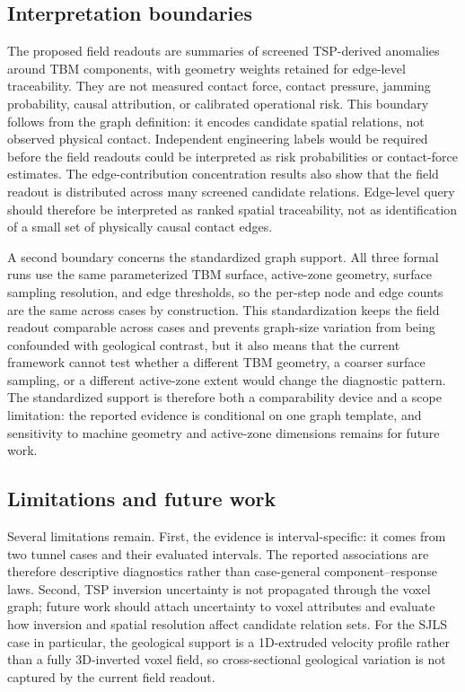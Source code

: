 \subsection{Interpretation boundaries}
\label{sec:interpretation_boundary}
The proposed field readouts are summaries of screened TSP-derived anomalies around
TBM components, with geometry weights retained for edge-level traceability.
They are not measured contact force, contact pressure, jamming probability,
causal attribution, or calibrated operational risk. This boundary follows from
the graph definition: it encodes candidate spatial relations, not observed
physical contact. Independent engineering labels would be required before the
field readouts could be interpreted as risk probabilities or contact-force
estimates.
The edge-contribution concentration results also show that the field readout is
distributed across many screened candidate relations. Edge-level query should
therefore be interpreted as ranked spatial traceability, not as identification
of a small set of physically causal contact edges.

A second boundary concerns the standardized graph support. All three formal
runs use the same parameterized TBM surface, active-zone geometry, surface
sampling resolution, and edge thresholds, so the per-step node and edge counts
are the same across cases by construction. This standardization keeps the
field readout comparable across cases and prevents graph-size variation from being
confounded with geological contrast, but it also means that the current
framework cannot test whether a different TBM geometry, a coarser surface
sampling, or a different active-zone extent would change the diagnostic
pattern. The standardized support is therefore both a comparability device and
a scope limitation: the reported evidence is conditional on one graph template,
and sensitivity to machine geometry and active-zone dimensions remains for
future work.

\subsection{Limitations and future work}
\label{sec:limitations}
Several limitations remain. First, the evidence is interval-specific: it comes
from two tunnel cases and their evaluated intervals. The reported associations
are therefore descriptive diagnostics rather than case-general
component--response laws. Second,
TSP inversion uncertainty is not propagated through the voxel graph; future
work should attach uncertainty to voxel attributes and evaluate how inversion
and spatial resolution affect candidate relation sets. For the SJLS case in
particular, the geological support is a 1D-extruded velocity profile rather
than a fully 3D-inverted voxel field, so cross-sectional geological variation
is not captured by the current field readout.

